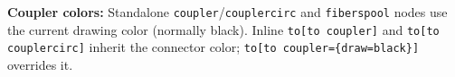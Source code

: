 \documentclass[11pt,a4paper]{article}
\begin{document}
\noindent\textbf{Coupler colors:} Standalone \texttt{coupler}/\texttt{couplercirc}
and \texttt{fiberspool} nodes use the current drawing color (normally black).
Inline \texttt{to[to coupler]} and \texttt{to[to couplercirc]} inherit the
connector color; \texttt{to[to coupler=\{draw=black\}]} overrides it.
\end{document}
